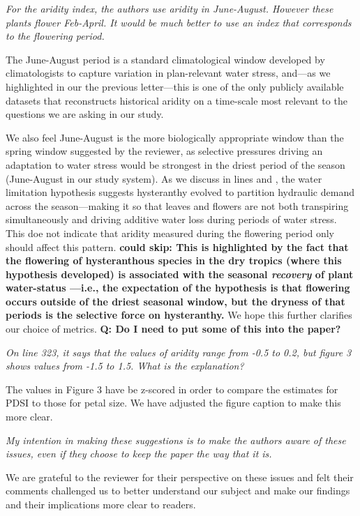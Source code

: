 \documentclass{article}[12pt]
\begin{document}
\emph{For the aridity index, the authors use aridity in June-August. However these plants flower Feb-April. It would be much better to use an index that corresponds to the flowering period.}

The June-August period is a standard climatological window developed by climatologists to capture variation in plan-relevant water stress, and---as we highlighted in our the previous letter---this is one of the only publicly available datasets that reconstructs historical aridity on a time-scale most relevant to the questions we are asking in our study.

We also feel June-August is the more biologically appropriate window than the spring window suggested by the reviewer, as selective pressures driving an adaptation to water stress would be strongest in the driest period of the season (June-August in our study system). As we discuss in lines  and , the water limitation hypothesis suggests hysteranthy evolved to partition hydraulic demand across the season---making it so that leaves and flowers are not both transpiring simultaneously and driving additive water loss during periods of water stress. This doe not indicate that aridity measured during the flowering period only should affect this pattern. \textbf{could skip: This is highlighted by the fact that the flowering of hysteranthous species in the dry tropics (where this hypothesis developed) is associated with the seasonal \emph{recovery} of plant water-status \citep{Franklin2016}---i.e., the expectation of the hypothesis is that flowering occurs outside of the driest seasonal window, but the dryness of that periods is the selective force on hysteranthy.} We hope this further clarifies our choice of metrics. \textbf{Q: Do I need to put some of this into the paper?}


\emph{On line 323, it says that the values of aridity range from -0.5 to 0.2, but figure 3 shows values from -1.5 to 1.5. What is the explanation?}

The values in Figure 3 have be z-scored in order to compare the estimates for PDSI to those for petal size. We have adjusted the figure caption to make this more clear.


\emph{My intention in making these suggestions is to make the authors aware of these issues, even if they choose to keep the paper the way that it is.}

We are grateful to the reviewer for their perspective on these issues and felt their comments challenged us to better understand our subject and make our findings and their implications more clear to readers.
\end{document}
